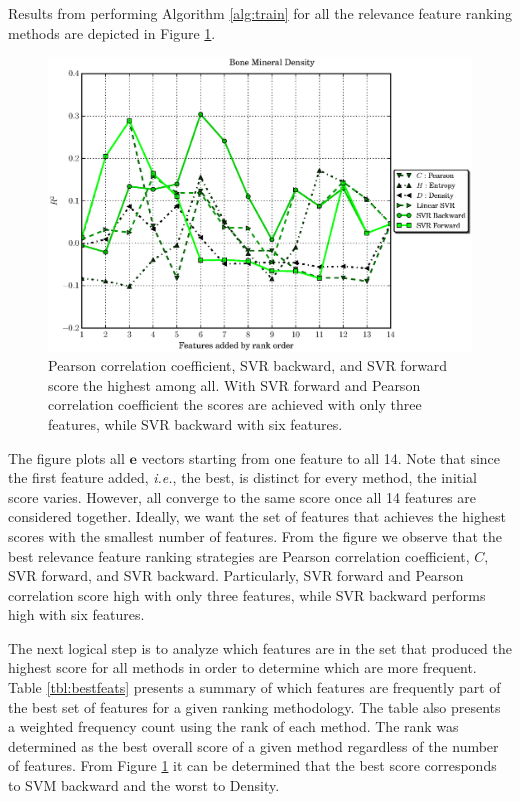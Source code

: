 \documentclass{bmcart}
\begin{document}
Results from performing Algorithm \ref{alg:train} for all the relevance feature
ranking methods are depicted in Figure \ref{fig:results}.
\begin{figure}[t]
    \caption{
Pearson correlation coefficient, SVR backward, and SVR forward score the
highest among all. With SVR forward and Pearson correlation coefficient the scores
are achieved with only three features, while SVR backward with six features.}
\label{fig:results}
    \includegraphics[width=\textwidth]{bmd_r2.eps}
\end{figure}
The figure plots all $\mathbf{e}$ vectors starting from one feature to all 14.
Note that since the first feature added, \emph{i.e.}, the best, is distinct for every
method, the initial score varies. However, all converge to the same score once
all 14 features are considered together. Ideally, we want the set of features
that achieves the highest scores with the smallest number of features. From the 
figure we observe that the best relevance feature ranking strategies are
Pearson correlation coefficient, $C$, SVR forward, and SVR backward.
Particularly, SVR forward and Pearson correlation score high with only three
features, while SVR backward performs high with six features.

The next logical step is to analyze which features are in the set that produced
the highest score for all methods in order to determine which are more
frequent. Table \ref{tbl:bestfeats} presents a summary of which features are
frequently part of the best set of features for a given ranking methodology.
The table also presents a weighted frequency count using the rank of each
method. The rank was determined as the best overall score of a given method
regardless of the number of features. From Figure \ref{fig:results} it can be
determined that the best score corresponds to SVM backward and the worst to
Density. 
\end{document}
